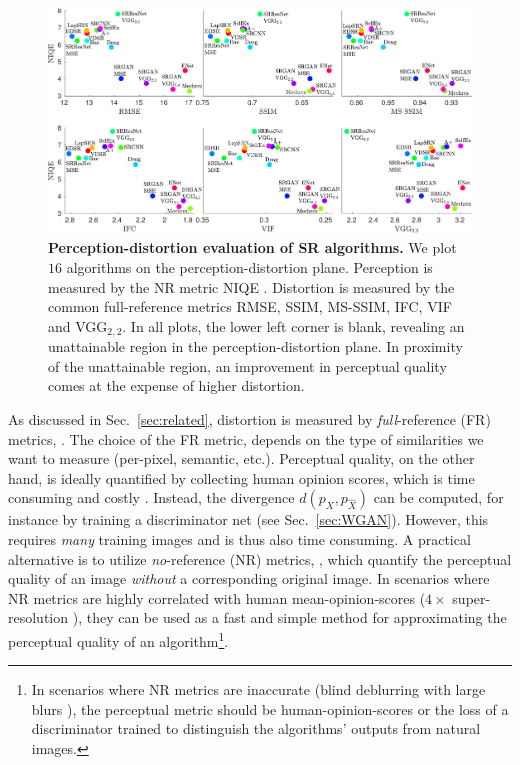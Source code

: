 \begin{figure}
	\begin{center}
		\includegraphics[width=\linewidth]{figures/NIQE.pdf}
	\end{center}
	\caption{\textbf{Perception-distortion evaluation of SR algorithms.} We plot $16$ algorithms on the perception-distortion plane. Perception is measured by the NR metric NIQE \cite{mittal2013making}. Distortion is measured by the common full-reference metrics RMSE, SSIM, MS-SSIM, IFC, VIF and VGG$_{2,2}$. In all plots, the lower left corner is blank, revealing an unattainable region in the perception-distortion plane. In proximity of the unattainable region, an improvement in perceptual quality comes at the expense of higher distortion.}
	\label{fig:noRefMethods1}
\end{figure}

As discussed in Sec.~\ref{sec:related}, distortion is measured by \emph{full}-reference (FR) metrics, \eg \cite{wang2004image,wang2003multiscale,sheikh2005information,sheikh2006image,chandler2007vsnr,zhang2011fsim,johnson2016perceptual}. The choice of the FR metric, depends on the type of similarities we want to measure (per-pixel, semantic, etc.). Perceptual quality, on the other hand, is ideally quantified by collecting human opinion scores, which is time consuming and costly \cite{moorthy2011blind,saad2012blind}. Instead, the divergence $d(p_X,p_{\hat{X}})$ can be computed, for instance by training a discriminator net (see Sec.~\ref{sec:WGAN}). However, this requires \emph{many} training images and is thus also time consuming. A practical alternative is to utilize \emph{no}-reference (NR) metrics, \eg  \cite{mittal2012no,mittal2013making,saad2012blind,moorthy2011blind,ye2012unsupervised,kang2014convolutional,ma2017learning}, which quantify the perceptual quality of an image \emph{without} a corresponding original image. In scenarios where NR metrics are highly correlated with human mean-opinion-scores (\eg $4\times$ super-resolution \cite{ma2017learning}), they can be used as a fast and simple method for approximating the perceptual quality of an algorithm\footnote{In scenarios where NR metrics are inaccurate (\eg blind deblurring with large blurs \cite{lai2016comparative,liu2013no}), the perceptual metric should be human-opinion-scores or the loss of a discriminator trained to distinguish the algorithms' outputs from natural images.}.

